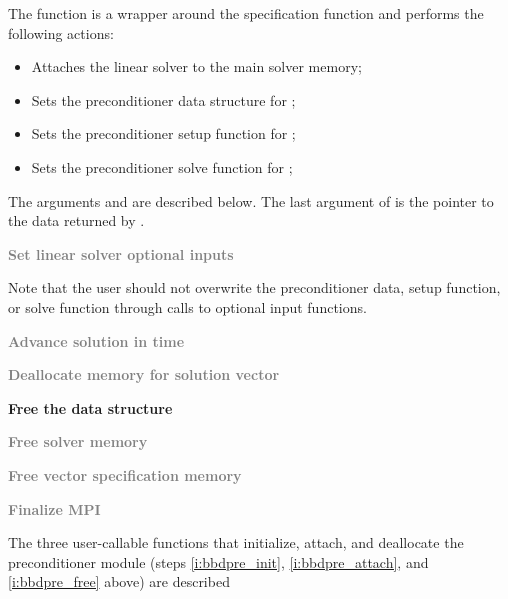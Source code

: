 \begin{Steps}
  The function  is a wrapper around the {\cvspgmr} specification
  function  and performs the following actions:
  \begin{itemize}
    \item Attaches the {\cvspgmr} linear solver to the main {\cvode} solver memory;
    \item Sets the preconditioner data structure for {\cvbbdpre};
    \item Sets the preconditioner setup function for {\cvbbdpre};
    \item Sets the preconditioner solve function for {\cvbbdpre};
  \end{itemize}
  The arguments  and  are described below.
  The last argument of  is the pointer to the {\cvbbdpre} data
  returned by .

\item
  \textcolor{gray}{\bf Set linear solver optional inputs}

  Note that the user should not overwrite the preconditioner data, setup function, 
  or solve function through calls to {\cvspgmr} optional input functions.

\item
  \textcolor{gray}{\bf Advance solution in time}

\item
  \textcolor{gray}{\bf Deallocate memory for solution vector}

\item \label{i:bbdpre_free}
  {\bf Free the {\cvbbdpre} data structure}


\item
  \textcolor{gray}{\bf Free solver memory}
  
\item
  \textcolor{gray}{\bf Free vector specification memory}

\item 
  \textcolor{gray}{\bf Finalize MPI}

\end{Steps}
The three user-callable functions that initialize, attach, and deallocate
the {\cvbbdpre} preconditioner module (steps \ref{i:bbdpre_init},
\ref{i:bbdpre_attach}, and \ref{i:bbdpre_free} above) are described
